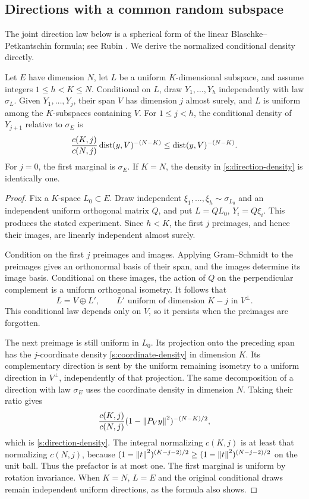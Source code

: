 \subsection{Directions with a common random subspace}

The joint direction law below is a spherical form of the linear
Blaschke--Petkantschin formula; see Rubin
\cite[Corollary~3.2, equation~(3.5)]{Rubin2018}.
We derive the normalized conditional density directly.

\begin{lemma}\label{s:directions}
Let \(E\) have dimension \(N\), let \(L\) be a uniform
\(K\)-dimensional subspace, and assume integers \(1\le h<K\le N\).
Conditional on \(L\), draw \(Y_1,\ldots,Y_h\) independently with
law \(\sigma_L\). Given \(Y_1,\ldots,Y_j\), their span \(V\) has
dimension \(j\) almost surely, and \(L\) is uniform among the
\(K\)-subspaces containing \(V\). For \(1\le j<h\), the conditional
density of \(Y_{j+1}\) relative to \(\sigma_E\) is
\begin{equation}\label{s:direction-density}
 \frac{c(K,j)}{c(N,j)}
 \operatorname{dist}(y,V)^{-(N-K)}
 \le \operatorname{dist}(y,V)^{-(N-K)}.
\end{equation}
For \(j=0\), the first marginal is \(\sigma_E\). If \(K=N\), the
density in \eqref{s:direction-density} is identically one.
\end{lemma}
\begin{proof}
Fix a \(K\)-space \(L_0\subset E\). Draw independent
\(\xi_1,\ldots,\xi_h\sim\sigma_{L_0}\) and an independent uniform
orthogonal matrix \(Q\), and put \(L=QL_0\), \(Y_i=Q\xi_i\).
This produces the stated experiment. Since \(h<K\), the first \(j\)
preimages, and hence their images, are linearly independent almost
surely.

Condition on the first \(j\) preimages and images. Applying
Gram--Schmidt to the preimages gives an orthonormal basis of their
span, and the images determine its image basis. Conditional on these
images, the action of \(Q\) on the perpendicular complement is a
uniform orthogonal isometry. It follows that
\[
 L=V\oplus L',\qquad
 L'\text{ uniform of dimension }K-j\text{ in }V^\perp.
\]
This conditional law depends only on \(V\), so it persists when the
preimages are forgotten.

The next preimage is still uniform in \(L_0\). Its projection onto
the preceding span has the \(j\)-coordinate density
\eqref{s:coordinate-density} in dimension \(K\). Its complementary
direction is sent by the uniform remaining isometry to a uniform
direction in \(V^\perp\), independently of that projection. The same
decomposition of a direction with law \(\sigma_E\) uses the coordinate
density in dimension \(N\). Taking their ratio gives
\[
 \frac{c(K,j)}{c(N,j)}
 (1-\left\lVert P_Vy\right\rVert^2)^{-(N-K)/2},
\]
which is \eqref{s:direction-density}. The integral normalizing
\(c(K,j)\) is at least that normalizing \(c(N,j)\), because
\((1-\left\lVert t\right\rVert^2)^{(K-j-2)/2}\ge
 (1-\left\lVert t\right\rVert^2)^{(N-j-2)/2}\) on the unit ball. Thus the prefactor
is at most one. The first marginal is uniform by rotation invariance.
When \(K=N\), \(L=E\) and the original conditional draws remain
independent uniform directions, as the formula also shows.
\end{proof}


